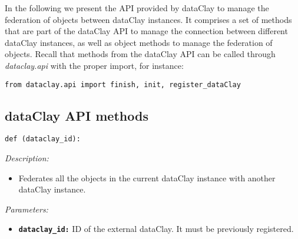 In the following we present the API provided by dataClay to manage the federation of objects between dataClay instances. It comprises a set of methods that are part of the dataClay API to manage the connection between different dataClay instances, as well as object methods to manage the federation of objects. Recall that methods from the dataClay API can be called through \textit{dataclay.api} with the proper import, for instance:

\colorbox{basecolor!20}{\texttt{from dataclay.api import finish, init, register\_dataClay}}

\subsection{dataClay API methods}
\label{sec:PythonFederationAPI}


\begin{dBox}
\texttt{def (dataclay\_id):}
\LINE

{\it Description:}

\begin{itemize}
  \item Federates all the objects in the current dataClay instance with another dataClay instance. 
\end{itemize}

{\it Parameters:}

\begin{itemize}
  \item \texttt{\bfseries dataclay\_id:} ID of the external dataClay. It must be previously registered.
\end{itemize}

\end{dBox}


